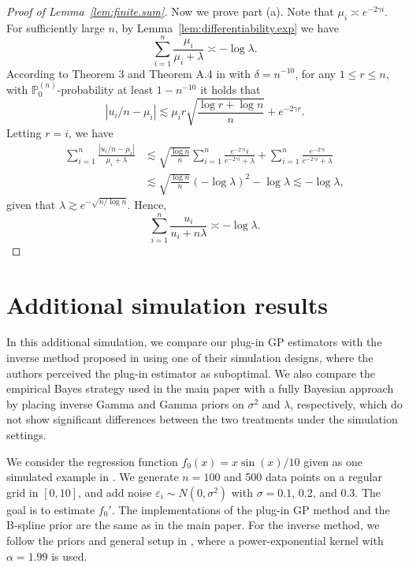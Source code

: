 \documentclass[12pt]{article}
\newcommand{\PP}{\mathbb{P}}
\theoremstyle{plain}
\theoremstyle{nonitalicremark}
\begin{document}
\begin{appendices}
\begin{proof}[Proof of Lemma~\ref{lem:finite.sum}]
Now we prove part (a). Note that $\mu_i \asymp e^{-2\gamma i}$. For sufficiently large $n$, by Lemma~\ref{lem:differentiability.exp} we have
\begin{equation}
\sum_{i=1}^n \frac{\mu_i}{\mu_i + \lambda} \asymp -\log\lambda.
\end{equation}
According to Theorem 3 and Theorem A.4 in \cite{braun2006accurate} with $\delta = n^{-10}$, for any $1\leq r\leq n$, with $\PP_0^{(n)}$-probability at least $1-n^{-10}$ it holds that
\begin{equation}
|u_i/n - \mu_i| \lesssim \mu_i r \sqrt{ \frac{\log r + \log n}{n}} + e^{-2\gamma r}.
\end{equation} 
Letting $r = i$, we have
\begin{align}
\sum_{i=1}^n \frac{ |u_i/n - \mu_i|}{\mu_i + \lambda} &\lesssim \sqrt{\frac{\log n}{n}}\sum_{i=1}^n \frac{e^{-2\gamma i} i}{e^{-2\gamma i} + \lambda} + \sum_{i=1}^n \frac{ e^{-2\gamma i }}{e^{-2\gamma i} + \lambda}\\
&\lesssim \sqrt{\frac{\log n}{n}} (-\log\lambda)^2 - \log\lambda \lesssim -\log\lambda,
\end{align}
given that $\lambda \gtrsim e^{-\sqrt{n/\log n}}$. Hence,
\begin{equation}
\sum_{i=1}^n \frac{u_i}{u_i + n\lambda} \asymp -\log\lambda.
\end{equation}
\end{proof}


\section{Additional simulation results} \label{sec:simulation1}

In this additional simulation, we compare our plug-in GP estimators with the inverse method proposed in \cite{holsclaw2013gaussian} using one of their simulation designs, where the authors perceived the plug-in estimator as suboptimal. We also compare the empirical Bayes strategy used in the main paper with a fully Bayesian approach by placing inverse Gamma and Gamma priors on $\sigma^2$ and $\lambda$, respectively, which do not show significant differences between the two treatments under the simulation settings. 

We consider the regression function $f_0 (x) = x \sin(x)/10$ given as one simulated example in \cite{holsclaw2013gaussian}. We generate $n = 100$ and 500 data points on a regular grid in $[0, 10]$, and add noise $\varepsilon_i\sim N(0, \sigma^2)$ with $\sigma = 0.1$, 0.2, and 0.3. The goal is to estimate $f_0'$. The implementations of the plug-in GP method and the B-spline prior are the same as in the main paper. For the inverse method, we follow the priors and general setup in \cite{holsclaw2013gaussian}, where a power-exponential kernel with $\alpha = 1.99$ is used.


\end{appendices}
\end{document}
